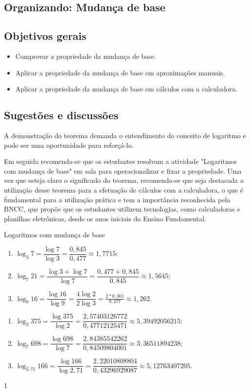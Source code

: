 \clearpage\def\currentcolor{session4}
\begin{texto}
{
	\section{Organizando: Mudança de base}
	\subsection{Objetivos gerais}
	\begin{itemize}
	\item Comprovar a propriedade da mudança de base.
	\item Aplicar a propriedade da mudança de base em aproximações manuais.
	\item Aplicar a propriedade da mudança de base em cálculos com a calculadora.
	\end{itemize}

	\subsection{Sugestões e discussões}
	A demonstração do teorema demanda o entendimento do conceito de logaritmo e pode ser uma oportunidade para reforçá-lo.

	Em seguida recomenda-se que os estudantes resolvam a atividade "Logaritmos com mudança de base" em sala para operacionalizar e fixar a propriedade. Uma vez que esteja claro o significado do teorema, recomenda-se que seja destacada a utilização desse teorema para a efetuação de cálculos com a calculadora, o que é fundamental para a utilização prática e tem a importância reconhecida pela BNCC, que propõe que os estudantes utilizem tecnologias, como calculadoras e planilhas eletrônicas, desde os anos iniciais do Ensino Fundamental. 
}
\end{texto}
\marginpar{\vspace{.5em}}
\begin{answer}{Logaritmos com mudança de base}
{
	\begin{enumerate}
	\item  $\log_3 7=\dfrac{\log 7}{\log 3} = \dfrac{0{,}845}{0{,}477} \approx 1{,}7715;$
	\item  $\log_7 21=\dfrac{\log 3 + \log 7}{\log 7} = \dfrac{0{,}477 + 0{,}845}{0{,}845} \approx 1{,}5645;$
	\item  $\log_9 16=\dfrac{\log 16}{\log 9} =\dfrac{4\log 2}{2\log 3} = \frac{2*0{,}301}{0{,}477} \approx 1{,}262.$
	\end{enumerate}

	\begin{enumerate}
	\item $\log_2 375=\dfrac{\log 375}{\log 2} = \dfrac{2{,}57403126772}{0{,}47712125471} \approx 5{,}39492056215;$
	\item $\log_7 698 =\dfrac{\log 698}{\log 7} = \dfrac{2{,}84385542262}{0{,}84509804001} \approx 3{,}36511894238;$
	\item $\log_{2{,}71} 166 = \dfrac{\log 166}{\log 2{,}71} = \dfrac{2{,}22010808804}{0{,}43296929087} \approx 5{,}12763407205.$
	\end{enumerate}
}{1}
\end{answer}

